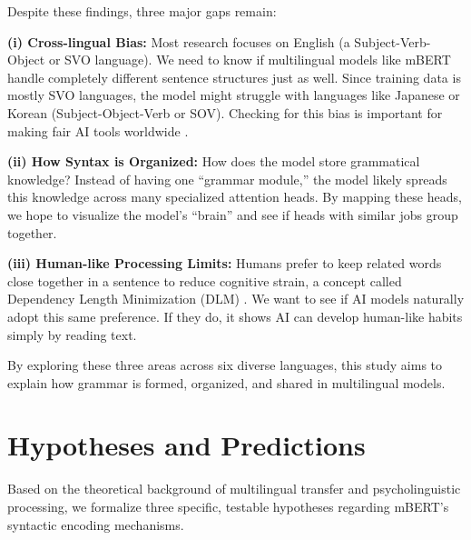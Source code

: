 \documentclass[11pt, a4paper]{article}
\begin{document}
Despite these findings, three major gaps remain: 

\textbf{(i) Cross-lingual Bias:} Most research focuses on English (a Subject-Verb-Object or SVO language). We need to know if multilingual models like mBERT handle completely different sentence structures just as well. Since training data is mostly SVO languages, the model might struggle with languages like Japanese or Korean (Subject-Object-Verb or SOV). Checking for this bias is important for making fair AI tools worldwide \citep{wu2020languages}.

\textbf{(ii) How Syntax is Organized:} How does the model store grammatical knowledge? Instead of having one ``grammar module,'' the model likely spreads this knowledge across many specialized attention heads. By mapping these heads, we hope to visualize the model's ``brain'' and see if heads with similar jobs group together.

\textbf{(iii) Human-like Processing Limits:} Humans prefer to keep related words close together in a sentence to reduce cognitive strain, a concept called Dependency Length Minimization (DLM) \citep{futrell2015dlm, gibson2000dependency}. We want to see if AI models naturally adopt this same preference. If they do, it shows AI can develop human-like habits simply by reading text.

By exploring these three areas across six diverse languages, this study aims to explain how grammar is formed, organized, and shared in multilingual models.

\section{Hypotheses and Predictions}

Based on the theoretical background of multilingual transfer and psycholinguistic processing, we formalize three specific, testable hypotheses regarding mBERT's syntactic encoding mechanisms.
\end{document}

